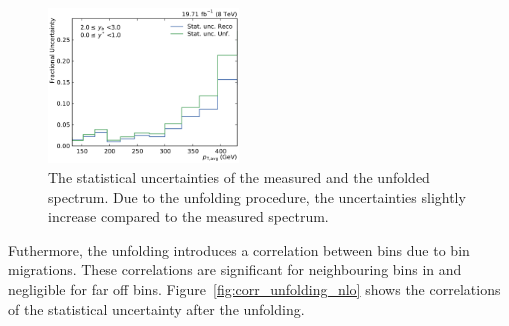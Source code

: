 \begin{figure}[htbp]
    \includegraphics[width=0.45\textwidth]{figures/measurement/statunc_fractional_yb2ys0.pdf}
    \caption[Statistical uncertainty of measured and unfolded sprectrum]{The statistical uncertainties of the measured and the unfolded spectrum. Due
    to the unfolding procedure, the uncertainties slightly increase compared to the
    measured spectrum.}
    \label{fig:statunc_relative}
\end{figure}

Futhermore, the unfolding introduces a correlation between bins due to bin
migrations. These correlations are significant for neighbouring bins in \pt and
negligible for far off bins. Figure~\ref{fig:corr_unfolding_nlo} shows the
correlations of the statistical uncertainty after the unfolding.

